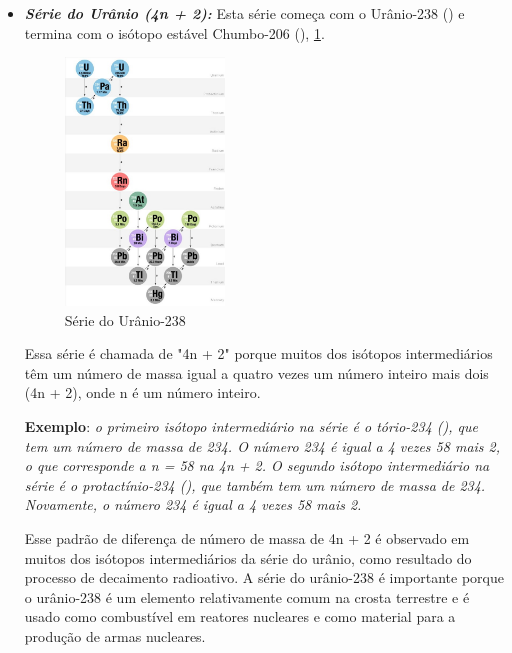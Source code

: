 \documentclass[11pt,a4paper]{article}
\begin{document}
\begin{itemize}
    	\item \textbf{\textit{\textcolor{CarnationPink}{Série do Urânio (4n + 2):}}} Esta série começa com o Urânio-238 () e termina com o isótopo estável Chumbo-206 (), \ref{fig:serieDoUranio}. 
                    
                            \begin{figure}[h]
                                \centering
                                \includegraphics[width=0.4\textwidth]{Imagens/serieDoUranio.jpg}
                                \caption{Série do Urânio-238}
                                \label{fig:serieDoUranio}
                            \end{figure}
                    
                        
        Essa série é chamada de "4n + 2" porque muitos dos isótopos intermediários têm um número de massa igual a quatro vezes um número inteiro mais dois (4n + 2), onde n é um número inteiro.

        \textbf{Exemplo}: \textit{o primeiro isótopo intermediário na série é o tório-234 (), que tem um número de massa de 234. O número 234 é igual a 4 vezes 58 mais 2, o que corresponde a n = 58 na  4n + 2. O segundo isótopo intermediário na série é o protactínio-234 (), que também tem um número de massa de 234. Novamente, o número 234 é igual a 4 vezes 58 mais 2.}
                    
        Esse padrão de diferença de número de massa de 4n + 2 é observado em muitos dos isótopos intermediários da série do urânio, como resultado do processo de decaimento radioativo. A série do urânio-238 é importante porque o urânio-238 é um elemento relativamente comum na crosta terrestre e é usado como combustível em reatores nucleares e como material para a produção de armas nucleares.



\end{itemize}
\end{document}
